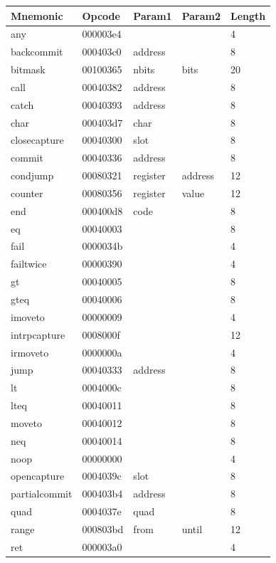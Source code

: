 
\begin{center}
\label{tab:naig_bytecode}
\begin{longtable}{lllll}
\textbf{Mnemonic} & \textbf{Opcode} & \textbf{Param1} & \textbf{Param2} & \textbf{Length} \\
\endhead
any & 000003e4 &  &   & 4 \\
backcommit & 000403c0 & address &   & 8 \\
bitmask & 00100365 & nbits & bits  & 20 \\
call & 00040382 & address &   & 8 \\
catch & 00040393 & address &   & 8 \\
char & 000403d7 & char &   & 8 \\
closecapture & 00040300 & slot &   & 8 \\
commit & 00040336 & address &   & 8 \\
condjump & 00080321 & register & address  & 12 \\
counter & 00080356 & register & value  & 12 \\
end & 000400d8 & code &   & 8 \\
eq & 00040003 &  &   & 8 \\
fail & 0000034b &  &   & 4 \\
failtwice & 00000390 &  &   & 4 \\
gt & 00040005 &  &   & 8 \\
gteq & 00040006 &  &   & 8 \\
imoveto & 00000009 &  &   & 4 \\
intrpcapture & 0008000f &  &   & 12 \\
irmoveto & 0000000a &  &   & 4 \\
jump & 00040333 & address &   & 8 \\
lt & 0004000c &  &   & 8 \\
lteq & 00040011 &  &   & 8 \\
moveto & 00040012 &  &   & 8 \\
neq & 00040014 &  &   & 8 \\
noop & 00000000 &  &   & 4 \\
opencapture & 0004039c & slot &   & 8 \\
partialcommit & 000403b4 & address &   & 8 \\
quad & 0004037e & quad &   & 8 \\
range & 000803bd & from & until  & 12 \\
ret & 000003a0 &  &   & 4 \\

\end{longtable}
\end{center}
